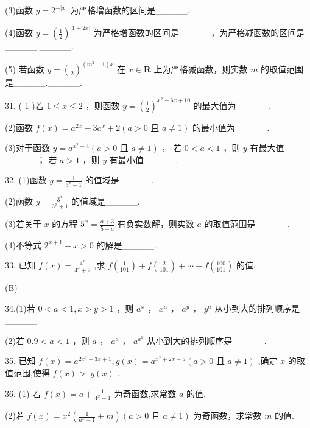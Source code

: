 \documentclass[10pt]{article}
\newcommand*\circled[1]{\tikz[baseline=(char.base)]{\node[shape=circle,draw,inner sep=1.5pt] (char) {\small #1};}}
\begin{document}
(3)函数 \(y = {2}^{-\left| x\right| }\) 为严格增函数的区间是\_\_\_\_\_.

(4)函数 \(y = {\left( \frac{1}{2}\right) }^{\left| 1 + 2x\right| }\) 为严格增函数的区间是\_\_\_\_\_，为严格减函数的区间是\_\_\_\_\_.\_\_\_\_\_.

(5) 若函数 \(y = {\left( \frac{1}{2}\right) }^{\left( {{m}^{2} - 1}\right) x}\) 在 \(x \in  \mathbf{R}\) 上为严格减函数，则实数 \(m\) 的取值范围是\_\_\_\_\_.\_\_\_\_\_.

31. ( 1 )若 \(1 \leq  x \leq  2\) ，则函数 \(y = {\left( \frac{1}{2}\right) }^{{x}^{2} - {6x} + {10}}\) 的最大值为\_\_\_\_\_.

(2)函数 \(f\left( x\right)  = {a}^{2x} - 3{a}^{x} + 2\left( {a > 0\text{ 且 }a \neq  1}\right)\) 的最小值为\_\_\_\_\_.

(3)对于函数 \(y = {a}^{{x}^{2} - 4}\left( {a > 0\text{ 且 }a \neq  1}\right)\) ， \circled{1} 若 \(0 < a < 1\) ，则 \(y\) 有最大值\_\_\_\_\_；  \circled{2} 若 \(a > 1\) ，则 \(y\) 有最小值\_\_\_\_\_.

32. (1)函数 \(y = \frac{1}{{3}^{x} - 1}\) 的值域是\_\_\_\_\_.

(2)函数 \(y = \frac{{3}^{x}}{{3}^{x} + 1}\) 的值域是\_\_\_\_\_.

(3)若关于 \(x\) 的方程 \({5}^{x} = \frac{a + 3}{5 - a}\) 有负实数解，则实数 \(a\) 的取值范围是\_\_\_\_\_.

(4)不等式 \({2}^{x + 1} + x > 0\) 的解是\_\_\_\_\_.

33. 已知 \(f\left( x\right)  = \frac{{4}^{x}}{{4}^{x} + 2}\) ,求 \(f\left( \frac{1}{101}\right)  + f\left( \frac{2}{101}\right)  + \cdots  + f\left( \frac{100}{101}\right)\) 的值.

(B)

34.(1)若 \(0 < a < 1,x > y > 1\) ，则 \({a}^{x}\) ， \({x}^{a}\) ， \({a}^{y}\) ， \({y}^{a}\) 从小到大的排列顺序是\_\_\_\_\_.

(2)若 \({0.9} < a < 1\) ，则 \(a\) ， \({a}^{a}\) ， \({a}^{{a}^{a}}\) 从小到大的排列顺序是\_\_\_\_\_.

35. 已知 \(f\left( x\right)  = {a}^{2{x}^{2} - {3x} + 1},g\left( x\right)  = {a}^{{x}^{2} + {2x} - 5}\left( {a > 0\text{ 且 }a \neq  1}\right)\) ,确定 \(x\) 的取值范围,使得 \(f\left( x\right)  > \; g\left( x\right)\) .

36. (1) 若 \(f\left( x\right)  = a + \frac{1}{{4}^{x} + 1}\) 为奇函数,求常数 \(a\) 的值.

(2)若 \(f\left( x\right)  = {x}^{2}\left( {\frac{1}{{a}^{x} - 1} + m}\right) \left( {a > 0\text{ 且 }a \neq  1}\right)\) 为奇函数，求常数 \(m\) 的值.
\end{document}
